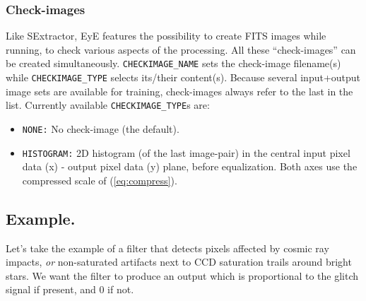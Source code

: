 \documentclass[11pt,titlepage]{article}
\begin{document}
\subsubsection{Check-images}
Like SExtractor, {\sc EyE} features the possibility to create FITS images while running, to check various
aspects of the processing. All these ``check-images'' can be created simultaneously. {\tt CHECKIMAGE\_NAME}
sets the check-image filename(s) while {\tt CHECKIMAGE\_TYPE} selects its/their content(s). Because several
input+output image sets are available for training, check-images always refer to the last in the list.
Currently available {\tt CHECKIMAGE\_TYPE}s are:
\begin{itemize}
\item{\tt NONE:} No check-image (the default). 
\item{\tt HISTOGRAM:} 2D histogram (of the last image-pair) in the central input pixel data (x) - output pixel
data (y) plane, before equalization. Both axes use the compressed scale of
(\ref{eq:compress}).
\end{itemize}

\subsection{Example.}
\label{chap:example}
Let's take the example of a filter that detects pixels affected by cosmic ray impacts, {\em or} non-saturated
artifacts next to CCD saturation trails around bright stars. We want the filter to produce an output which is
proportional to the glitch signal if present, and 0 if not.
\end{document}
